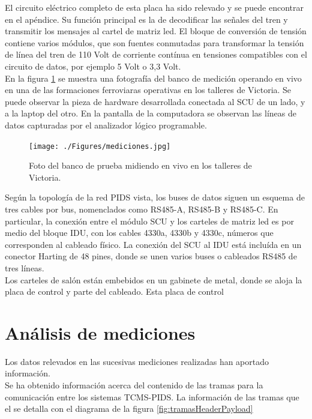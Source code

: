 El circuito eléctrico completo de esta placa ha sido relevado y se puede encontrar en el apéndice. Su función principal es la de decodificar las señales del tren y transmitir los mensajes al cartel de matriz led. El bloque de conversión de tensión contiene varios módulos, que son fuentes conmutadas para transformar la tensión de línea del tren de 110 Volt de corriente contínua en tensiones compatibles con el circuito de datos, por ejemplo 5 Volt o 3,3 Volt.\\

En la figura \ref{fig:mediciones} se muestra una fotografía del banco de medición operando en vivo en una de las formaciones ferroviaras operativas en los talleres de Victoria. Se puede observar la pieza de hardware desarrollada conectada al SCU de un lado, y a la laptop del otro. En la pantalla de la computadora se observan las líneas de datos capturadas por el analizador lógico programable.\\

\begin{figure}[H]
	\centering
	\texttt{[image: ./Figures/mediciones.jpg]}
	\caption{Foto del banco de prueba midiendo en vivo en los talleres de Victoria.}
	\label{fig:mediciones}
\end{figure}



Según la topología de la red PIDS vista, los buses de datos siguen un esquema de tres cables por bus, nomenclados como RS485-A, RS485-B y RS485-C. En particular, la conexión entre el módulo SCU y los carteles de matriz led es por medio del bloque IDU, con los cables 4330a, 4330b y 4330c, números que corresponden al cableado físico. La conexión del SCU al IDU está incluída en un conector Harting de 48 pines, donde se unen varios buses o cableados RS485 de tres líneas.  \\

Los carteles de salón están embebidos en un gabinete de metal, donde se aloja la placa de control y parte del cableado. Esta placa de control
 
\section{Análisis de mediciones}

Los datos relevados en las sucesivas mediciones realizadas han aportado información.\\
Se ha obtenido información acerca del contenido de las tramas para la comunicación entre los sistemas TCMS-PIDS. La información de las tramas que el se detalla con el diagrama de la figura \ref{fig:tramasHeaderPayload}


